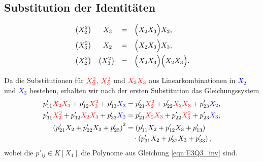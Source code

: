 \documentclass[11pt]{beamer}
\theoremstyle{custom}
\theoremstyle{custom}
\begin{document}
	\subsection*{Substitution der Identitäten}
	\begin{frame}
		\begin{equation}
			\begin{alignedat}{-1}
				&\left(X_{2}^2\right) &X_{3}\ & &=& &\Bigl(X_{2}X_{3} \Bigr)&  X_{2},\\
				&\left(X_{3}^2\right) &X_{2}\ & &=& &\Bigl(X_{2}X_{3} \Bigr)&  X_{3},\\
				&\left(X_{2}^2\right) &\left( X_{3}^2\right)&  &=& &\Bigl(X_{2}X_{3} \Bigr)&  \Bigl(X_{2}X_{3} \Bigr).
			\end{alignedat}
		\end{equation}
	\end{frame}
	\begin{frame}
		Da die Substitutionen für $\textcolor{red}{X_{2}^2}$, $\textcolor{red}{X_{3}^2}$ und $\textcolor{red}{X_{2}X_{3}}$ aus Linearkombinationen in \textcolor{blue}{$X_{2}$} und \textcolor{blue}{$X_{3}$} bestehen, erhalten wir nach der ersten Substitution das Gleichungssystem
		\begin{equation}
			\begin{alignedat}{1}
				p'_{11}\textcolor{red}{X_{2}X_{3}}+p'_{12}\textcolor{red}{X_{3}^2}+p'_{13}\textcolor{blue}{X_{3}}&=p'_{21}\textcolor{red}{X_{2}^2}+p'_{22}\textcolor{red}{X_{2}X_{3}}+p'_{23}\textcolor{blue}{X_{2}},\\
				p'_{31}\textcolor{red}{X_{2}^2}+p'_{32}\textcolor{red}{X_{2}X_{3}}+p'_{33}\textcolor{blue}{X_{2}}&=p'_{21}\textcolor{red}{X_{2}X_{3}}+p'_{22}\textcolor{red}{X_{3}^2}+p'_{23}\textcolor{blue}{X_{3}},\\
				\left(p'_{21}X_{2}+p'_{22}X_{3}+p'_{23}\right)^2&=\left( p'_{11}X_{2}+p'_{12}X_{3}+p'_{13}\right)\\ & \quad \cdot \left( p'_{31}X_{2}+p'_{32}X_{3}+p'_{33}\right),
			\end{alignedat}
		\end{equation}
		wobei die $p'_{ij} \in K[X_{1}]$ die Polynome aus Gleichung \eqref{eqn:E3Q3_inv} sind.
	\end{frame}
\end{document}

